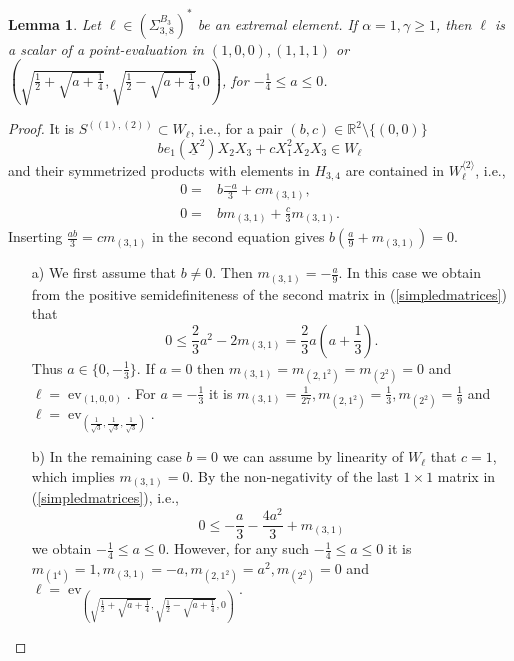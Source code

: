 \documentclass[11pt,a4paper]{amsart}
\numberwithin{equation}{section}
\newtheorem{lemma}[thm]{Lemma}
\theoremstyle{definition}
\newcommand{\R}{\mathbb{R}}
\DeclareMathOperator{\ev}{ev}
\numberwithin{thm}{section}
\theoremstyle{break}
\numberwithin{subcase}{case}
\begin{document}
 \begin{lemma}\label{le:38Teil4}
 Let $\ell \in \left(\Sigma_{3,8}^{B_3}\right)^\ast$ be an extremal element. If $\alpha = 1, \gamma \geq 1$, then $\ell$ is a scalar of a point-evaluation in $(1,0,0), (1,1,1)$ or $\left(\sqrt{\frac{1}{2}+\sqrt{a+\frac{1}{4}}},\sqrt{\frac{1}{2}-\sqrt{a+\frac{1}{4}}},0\right)$, for $ -\frac{1}{4}\leq a \leq 0$.
 \end{lemma}
 \begin{proof}
 It is $S^{((1),(2))} \subset W_\ell$, i.e., for a pair $(b,c) \in \R^2 \setminus \{(0,0)\}$  $$be_1(\underline{X}^2)X_2X_3+cX_1^2X_2X_3 \in W_\ell$$ and their symmetrized products with elements in $H_{3,4}$ are contained in $W_\ell^{\langle 2 \rangle}$, i.e., \begin{align*}
    0=& b \frac{-a}{3}+cm_{(3,1)}, \\  0=&bm_{(3,1)}+\frac{c}{3}m_{(3,1)}.
 \end{align*} Inserting $\frac{ab}{3}=cm_{(3,1)}$ in the second equation gives $b \left( \frac{a}{9}+m_{(3,1)}\right) = 0.$ 
 \begin{itemize}
     \item[a)] We first assume that $b \neq 0$. Then $m_{(3,1)} = -\frac{a}{9}$. In this case we obtain from the positive semidefiniteness of the second matrix in (\ref{simpledmatrices}) that $$ 0 \leq \frac{2}{3}a^2-2m_{(3,1)} = \frac{2}{3}a(a + \frac{1}{3}).$$ Thus $a \in \{0,-\frac{1}{3}\}.$ If $a=0$ then $m_{(3,1)} =m_{(2,1^2)}=m_{(2^2)}=0$ and $\ell = \ev_{(1,0,0)}$. For $ a = -\frac{1}{3}$ it is $m_{(3,1)}=\frac{1}{27}, m_{(2,1^2)}= \frac{1}{3}, m_{(2^2)} = \frac{1}{9}$ and $\ell = \ev_{\left( \frac{1}{\sqrt{3}} ,\frac{1}{\sqrt{3}},\frac{1}{\sqrt{3}} \right)}.$
     \item[b)] In the remaining case $b = 0$ we can assume by linearity of $W_\ell$ that $c=1$, which implies $m_{(3,1)} = 0$. By the non-negativity of the last $1 \times 1$ matrix in (\ref{simpledmatrices}), i.e., $$0 \leq -\frac{a}{3}-\frac{4a^2}{3}+m_{(3,1)}$$ we obtain $-\frac{1}{4}\leq a \leq 0$. However, for any such $-\frac{1}{4} \leq a \leq 0$ it is $m_{(1^4)}=1,m_{(3,1)}=-a,m_{(2,1^2)}=a^2,m_{(2^2)}=0$ and $\ell = \ev_{ \left(\sqrt{\frac{1}{2}+\sqrt{a+\frac{1}{4}}},\sqrt{\frac{1}{2}-\sqrt{a+\frac{1}{4}}},0\right)}.$ 
 \end{itemize}
 \end{proof}
 
\end{document}
